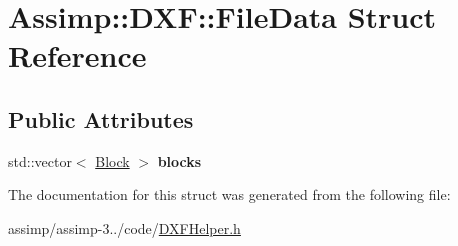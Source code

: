 \hypertarget{struct_assimp_1_1_d_x_f_1_1_file_data}{\section{Assimp\+:\+:D\+X\+F\+:\+:File\+Data Struct Reference}
\label{struct_assimp_1_1_d_x_f_1_1_file_data}
}
\subsection*{Public Attributes}
\begin{DoxyCompactItemize}
\item 
\hypertarget{struct_assimp_1_1_d_x_f_1_1_file_data_adf18fbff8f2505d4c69f26abe9b6f4da}{std\+::vector$<$ \hyperlink{struct_assimp_1_1_d_x_f_1_1_block}{Block} $>$ {\bfseries blocks}}\label{struct_assimp_1_1_d_x_f_1_1_file_data_adf18fbff8f2505d4c69f26abe9b6f4da}

\end{DoxyCompactItemize}


The documentation for this struct was generated from the following file\+:\begin{DoxyCompactItemize}
\item 
assimp/assimp-\/3../code/\hyperlink{_d_x_f_helper_8h}{D\+X\+F\+Helper.\+h}\end{DoxyCompactItemize}
